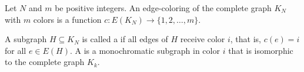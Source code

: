 \begin{definition} \label{definition:monochromatic_subgraph_in_an_edge_coloring_of_a_complete_graph}
Let $N$ and $m$ be positive integers. An edge-coloring of the complete graph $K_N$ with $m$ colors is a function $c: E(K_N) \to \{1, 2, \dots, m\}$.

A subgraph $H \subseteq K_N$ is called a  if all edges of $H$ receive color $i$, that is, $c(e) = i$ for all $e \in E(H)$. A  is a monochromatic subgraph in color $i$ that is isomorphic to the complete graph $K_k$.
\end{definition}

